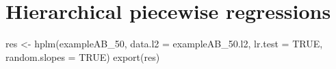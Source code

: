 \documentclass[
]{book}
\newenvironment{Shaded}{\begin{snugshade}}{\end{snugshade}}
\newcommand{\AttributeTok}[1]{\textcolor[rgb]{0.77,0.63,0.00}{#1}}
\newcommand{\ConstantTok}[1]{\textcolor[rgb]{0.00,0.00,0.00}{#1}}
\newcommand{\FunctionTok}[1]{\textcolor[rgb]{0.00,0.00,0.00}{#1}}
\newcommand{\NormalTok}[1]{#1}
\newcommand{\OtherTok}[1]{\textcolor[rgb]{0.56,0.35,0.01}{#1}}
\begin{document}
\hypertarget{hierarchical-piecewise-regressions}{%
\section{Hierarchical piecewise regressions}\label{hierarchical-piecewise-regressions}}

\begin{Shaded}
\begin{Highlighting}[]
\NormalTok{res }\OtherTok{\textless{}{-}} \FunctionTok{hplm}\NormalTok{(exampleAB\_50, }\AttributeTok{data.l2 =}\NormalTok{ exampleAB\_50.l2, }\AttributeTok{lr.test =} \ConstantTok{TRUE}\NormalTok{, }\AttributeTok{random.slopes =} \ConstantTok{TRUE}\NormalTok{)}
\FunctionTok{export}\NormalTok{(res)}
\end{Highlighting}
\end{Shaded}
\end{document}
